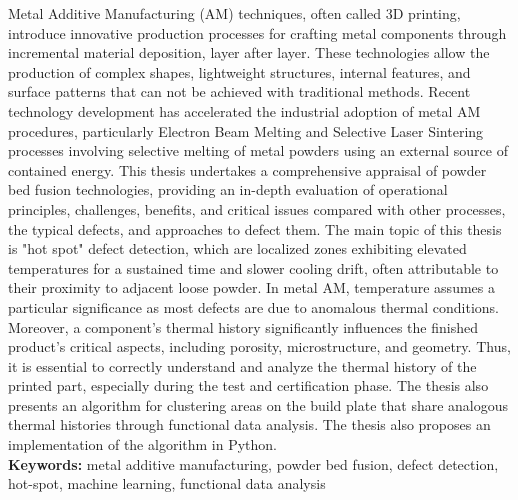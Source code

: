 Metal Additive Manufacturing (AM) techniques, often called 3D printing, introduce innovative production processes for crafting metal components through incremental material deposition, layer after layer. These technologies allow the production of complex shapes, lightweight structures, internal features, and surface patterns that can not be achieved with traditional methods. Recent technology development has accelerated the industrial adoption of metal AM procedures, particularly Electron Beam Melting and Selective Laser Sintering processes involving selective melting of metal powders using an external source of contained energy.
This thesis undertakes a comprehensive appraisal of powder bed fusion technologies, providing an in-depth evaluation of operational principles, challenges, benefits, and critical issues compared with other processes, the typical defects, and approaches to defect them. The main topic of this thesis is "hot spot" defect detection, which are localized zones exhibiting elevated temperatures for a sustained time and slower cooling drift, often attributable to their proximity to adjacent loose powder. In metal AM, temperature assumes a particular significance as most defects are due to anomalous thermal conditions. Moreover, a component's thermal history significantly influences the finished product's critical aspects, including porosity, microstructure, and geometry. Thus, it is essential to correctly understand and analyze the thermal history of the printed part, especially during the test and certification phase. The thesis also presents an algorithm for clustering areas on the build plate that share analogous thermal histories through functional data analysis. The thesis also proposes an implementation of the algorithm in Python.
\\[0.5cm]
\textbf{Keywords:} metal additive manufacturing, powder bed fusion, defect detection, hot-spot, machine learning, functional data analysis

